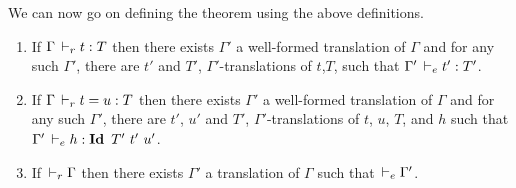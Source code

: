 \documentclass[a4paper,english]{lipics-utf8x}
\begin{document}
  We can now go on defining the theorem using the above definitions.

  \begin{theorem}[Translation]
    \label{thm:transl}
    \leavevmode
    \begin{enumerate}
      \item If $\Gamma \,\vdash_r t : T$ then there exists $\Gamma'$ a well-formed
      translation of $\Gamma$ and for any such $\Gamma'$, there are $t'$ and
      $T'$, $\Gamma'$-translations of $t$,$T$,
      such that $\Gamma' \,\vdash_e t' : T'$.
      \item If $\Gamma \,\vdash_r t = u : T$ then there exists $\Gamma'$ a
      well-formed translation of $\Gamma$ and for any such $\Gamma'$, there are
      $t'$, $u'$ and $T'$, $\Gamma'$-translations of $t$, $u$, $T$, and $h$ such
      that $\Gamma' \dere h : \Id T'\ t'\ u'$.
      \item If $\,\vdash_r \Gamma$ then there exists $\Gamma'$ a translation of
      $\Gamma$ such that $\,\vdash_e \Gamma'$.
    \end{enumerate}
  \end{theorem}
\end{document}
